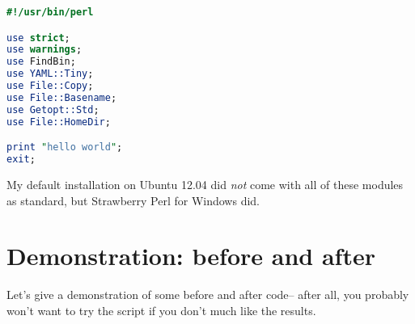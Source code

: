  	\begin{lstlisting}[language=Perl,caption={\lstinline!helloworld.pl!}]
#!/usr/bin/perl

use strict;
use warnings;           
use FindBin;            
use YAML::Tiny;         
use File::Copy;         
use File::Basename;     
use Getopt::Std;        
use File::HomeDir;      

print "hello world";
exit;
 	\end{lstlisting}
 	My default installation on Ubuntu 12.04 did \emph{not} come
 	with all of these modules as standard, but Strawberry Perl for Windows \cite{strawberryperl}
 	did.
 	 	
\section{Demonstration: before and after}
 Let's give a demonstration of some before and after code-- after all, you probably
 won't want to try the script if you don't much like the results.
  
